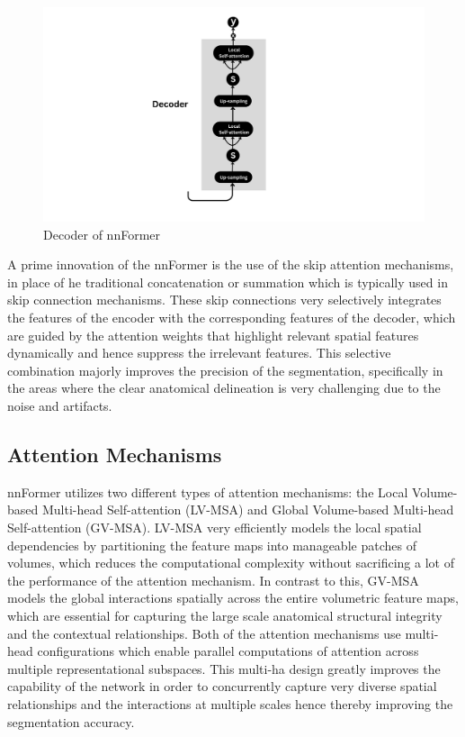 \begin{figure}[htb!] %
\centering
\centering
\includegraphics[width=1\textwidth]{images/Decoder.png}
\caption{\centering Decoder of nnFormer}
\label{Fig:decoder}
\end{figure}

A prime innovation of the nnFormer is the use of the skip attention mechanisms, in place of he traditional concatenation or summation which is typically used in skip connection mechanisms. These skip connections very selectively integrates the features of the encoder with the corresponding features of the decoder, which are guided by the attention weights that highlight relevant spatial features dynamically and hence suppress the irrelevant features. This selective combination majorly improves the precision of the segmentation, specifically in the areas where the clear anatomical delineation is very challenging due to the noise and artifacts.

\subsection{Attention Mechanisms}
nnFormer utilizes two different types of attention mechanisms: the Local Volume-based Multi-head Self-attention (LV-MSA) and Global Volume-based Multi-head Self-attention (GV-MSA). LV-MSA very efficiently models the local spatial dependencies by partitioning the feature maps into manageable patches of volumes, which reduces the computational complexity without sacrificing a lot of the performance of the attention mechanism. In contrast to this, GV-MSA models the global interactions spatially across the entire volumetric feature maps, which are essential for capturing the large scale anatomical structural integrity and the contextual relationships. Both of the attention mechanisms use multi-head configurations which enable parallel computations of attention across multiple representational subspaces. This multi-ha design greatly improves the capability of the network in order to concurrently capture very diverse spatial relationships and the interactions at multiple scales hence thereby improving the segmentation accuracy.

